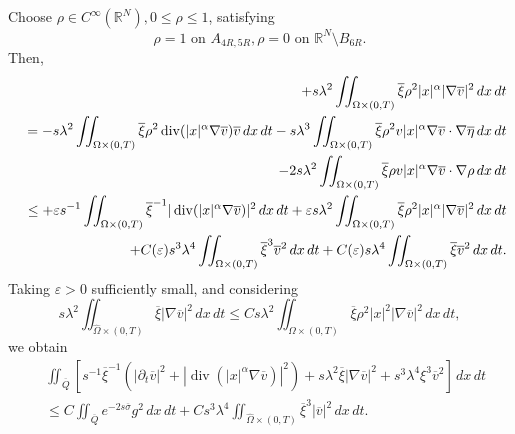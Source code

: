 \documentclass[11pt]{article}
\numberwithin{equation}{section}
\DeclareMathOperator{\Div}{div}
\begin{document}
Choose $\rho \in C^\infty(\mathbb{R}^N), 0 \leq \rho \leq 1$, satisfying
\begin{equation*}
	\rho = 1   \text{ on } A_{4R,5R},   \rho = 0   \text{ on } \mathbb{R}^N \setminus B_{6R}.
\end{equation*}
Then,
\begin{eqnarray*}
	&&+s\lambda^2 \iint_{\Omega \times (0,T)} \overline{\xi} \rho^2 |x|^\alpha |\nabla \overline{v}|^2 \, dx \, dt \\
	&&= -s\lambda^2 \iint_{\Omega \times (0,T)} \overline{\xi} \rho^2 \Div(|x|^\alpha \nabla \overline{v}) \overline{v} \, dx \, dt - s\lambda^3 \iint_{\Omega \times (0,T)} \overline{\xi} \rho^2 v |x|^\alpha \nabla \overline{v} \cdot \nabla \overline{\eta} \, dx \, dt \\
	&&\hspace{4.5mm} - 2s\lambda^2 \iint_{\Omega \times (0,T)} \overline{\xi} \rho v |x|^\alpha \nabla \overline{v} \cdot \nabla \rho \, dx \, dt \\
	&&\leq +\varepsilon s^{-1} \iint_{\Omega \times (0,T)} \overline{\xi}^{-1} |\Div(|x|^\alpha \nabla \overline{v})|^2 \, dx \, dt + \varepsilon s\lambda^2 \iint_{\Omega \times (0,T)} \overline{\xi} \rho^2 |x|^\alpha |\nabla \overline{v}|^2 \, dx \, dt \\
	&&\hspace{4.5mm} + C(\varepsilon)s^3\lambda^4 \iint_{\Omega \times (0,T)} \overline{\xi}^3 \overline{v}^2 \, dx \, dt + C(\varepsilon)s\lambda^4 \iint_{\Omega \times (0,T)} \overline{\xi} \overline{v}^2 \, dx \, dt.
\end{eqnarray*}
Taking $\varepsilon > 0$ sufficiently small, and considering
\begin{equation*}
	s\lambda^2 \iint_{\widehat{\Omega} \times (0,T)} \overline{\xi} |\nabla \overline{v}|^2 \, dx \, dt \leq Cs\lambda^2 \iint_{\Omega \times (0,T)} \overline{\xi} \rho^2 |x|^2 |\nabla \overline{v}|^2 \, dx \, dt,
\end{equation*}
we obtain
\begin{equation}\label{12.24.7}
	\begin{split}
		&\iint_{\overline{Q}} \left[ s^{-1}\overline{\xi}^{-1} \left( |\partial_t \overline{v}|^2 + |\Div(|x|^\alpha \nabla \overline{v})|^2 \right) + s\lambda^2 \overline{\xi} |\nabla \overline{v}|^2 + s^3\lambda^4 \xi^3 \overline{v}^2 \right] \, dx \, dt \\
		&\leq C\iint_{\overline{Q}} e^{-2s\overline{\sigma}} g^2 \, dx \, dt + Cs^3\lambda^4 \iint_{\widehat{\Omega} \times (0,T)} \overline{\xi}^3 |\overline{v}|^2 \, dx \, dt.
	\end{split}
\end{equation}
\end{document}
